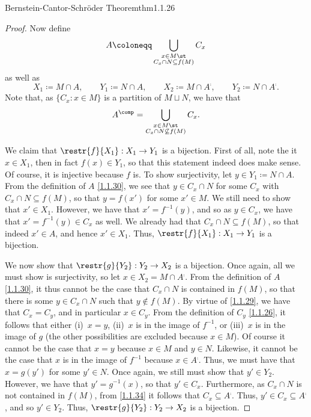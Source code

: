 \begin{thm}{Bernstein-Cantor-Schröder Theorem}{thm1.1.26}
\begin{proof}
		Now define
		\begin{equation}\label{1.1.30}
		A\coloneqq \bigcup _{\substack{x\in M\st \\ C_x\cap N\subseteq f(M)}}C_x
		\end{equation}
		as well as
		\begin{equation}
		X_1\coloneqq M\cap A,\qquad Y_1\coloneqq N\cap A,\qquad X_2\coloneqq M\cap A^{\comp},\qquad Y_2\coloneqq N\cap A^{\comp}.
		\end{equation}
		Note that, as $\{ C_x:x\in M\}$ is a partition of $M\sqcup N$, we have that
		\begin{equation}\label{1.1.34}
		A^{\comp}=\bigcup _{\substack{x\in M\st \\ C_x\cap N\not \subseteq f(M)}}C_x.
		\end{equation}
		
		We claim that $\restr{f}{X_1}:X_1\rightarrow Y_1$ is a bijection.  First of all, note the it $x\in X_1$, then in fact $f(x)\in Y_1$, so that this statement indeed does make sense.  Of course, it is injective because $f$ is.  To show surjectivity, let $y\in Y_1\coloneqq N\cap A$.  From the definition of $A$ \eqref{1.1.30}, we see that $y\in C_x\cap N$ for some $C_x$ with $C_x\cap N\subseteq f(M)$, so that $y=f(x')$ for some $x'\in M$.  We still need to show that $x'\in X_1$.  However, we have that $x'=f^{-1}(y)$, and so as $y\in C_x$, we have that $x'=f^{-1}(y)\in C_x$ as well.  We already had that $C_x\cap N\subseteq f(M)$, so that indeed $x'\in A$, and hence $x'\in X_1$.  Thus, $\restr{f}{X_1}:X_1\rightarrow Y_1$ is a bijection.
		
		We now show that $\restr{g}{Y_2}:Y_2\rightarrow X_2$ is a bijection.  Once again, all we must show is surjectivity, so let $x\in X_2=M\cap A^{\comp}$. From the definition of $A$ \eqref{1.1.30}, it thus cannot be the case that $C_x\cap N$ is contained in $f(M)$, so that there is some $y\in C_x\cap N$ such that $y\notin f(M)$.  By virtue of \eqref{1.1.29}, we have that $C_x=C_y$, and in particular $x\in C_y$.  From the definition of $C_y$ \eqref{1.1.26}, it follows that either (i)~$x=y$, (ii)~$x$ is in the image of $f^{-1}$, or (iii)~$x$ is in the image of $g$ (the other possibilities are excluded because $x\in M$).  Of course it cannot be the case that $x=y$ because $x\in M$ and $y\in N$.  Likewise, it cannot be the case that $x$ is in the image of $f^{-1}$ because $x\in A^{\comp}$.  Thus, we must have that $x=g(y')$ for some $y'\in N$.  Once again, we still must show that $y'\in Y_2$.  However, we have that $y'=g^{-1}(x)$, so that $y'\in C_x$.  Furthermore, as $C_x\cap N$ is not contained in $f(M)$, from \eqref{1.1.34} it follows that $C_x\subseteq A^{\comp}$.  Thus, $y'\in C_x\subseteq A^{\comp}$, and so $y'\in Y_2$.  Thus, $\restr{g}{Y_2}:Y_2\rightarrow X_2$ is a bijection.
		

\end{proof}
\end{thm}
